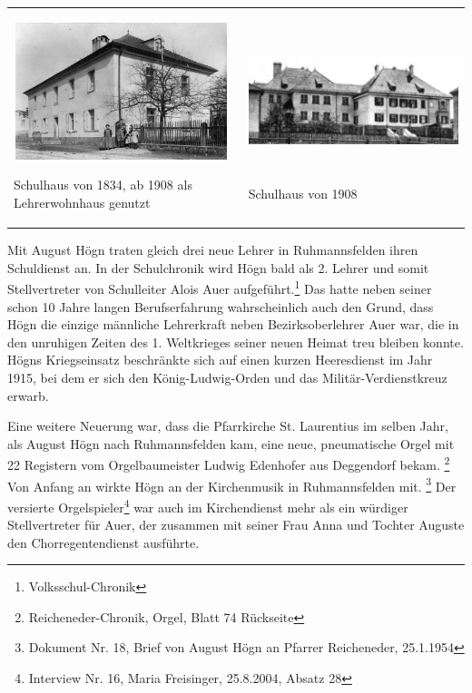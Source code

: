 \begin{flushleft}
\tablefirsthead{}
\tablehead{}
\tabletail{}
\tablelasttail{}
\begin{supertabular}{m{6.452cm}m{9.653cm}}

\includegraphics[width=6.269cm,height=3.999cm]{pictures/zulassungsarbeit-img017.jpg}

Schulhaus von
1834, ab 1908 als Lehrerwohnhaus genutzt &

\includegraphics[width=9.47cm,height=4.001cm]{pictures/zulassungsarbeit-img018.jpg}

Schulhaus von
1908\\
\end{supertabular}
\end{flushleft}
Mit August Högn traten gleich drei neue Lehrer in Ruhmannsfelden ihren
Schuldienst an. In der Schulchronik wird Högn bald als 2. Lehrer und
somit Stellvertreter von Schulleiter Alois Auer aufgeführt.\footnote{
Volksschul-Chronik} Das hatte neben seiner schon 10 Jahre langen
Berufserfahrung wahrscheinlich auch den Grund, dass Högn die einzige
männliche Lehrerkraft neben Bezirksoberlehrer Auer war, die in den
unruhigen Zeiten des 1. Weltkrieges seiner neuen Heimat treu bleiben
konnte. Högns Kriegseinsatz beschränkte sich auf einen kurzen
Heeresdienst im Jahr 1915, bei dem er sich den König-Ludwig-Orden und
das Militär-Verdienstkreuz erwarb.

Eine weitere Neuerung war, dass die Pfarrkirche St. Laurentius im selben
Jahr, als August Högn nach Ruhmannsfelden kam, eine neue, pneumatische
Orgel mit 22 Registern vom Orgelbaumeister Ludwig Edenhofer aus
Deggendorf bekam. \footnote{Reicheneder-Chronik, Orgel, Blatt 74
Rückseite} Von Anfang an wirkte Högn an der Kirchenmusik in
Ruhmannsfelden mit. \footnote{Dokument Nr. 18, Brief von August Högn an
Pfarrer Reicheneder, 25.1.1954} Der versierte Orgelspieler\footnote{
Interview Nr. 16, Maria Freisinger, 25.8.2004, Absatz 28} war auch im
Kirchendienst mehr als ein würdiger Stellvertreter für Auer, der
zusammen mit seiner Frau Anna und Tochter Auguste den
Chorregentendienst ausführte.

